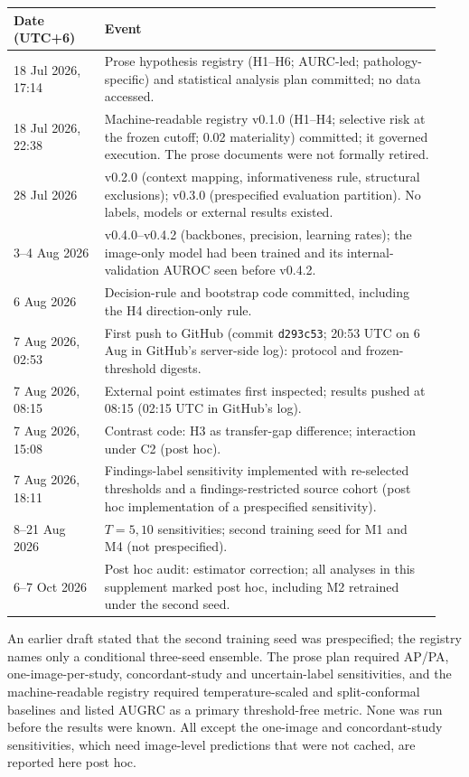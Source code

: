 \documentclass[10pt,a4paper]{article}
\begin{document}
\begin{center}\small
\begin{tabular}{p{0.2\linewidth}p{0.74\linewidth}}
\toprule
Date (UTC+6) & Event\\
\midrule
18 Jul 2026, 17:14 & Prose hypothesis registry (H1--H6; AURC-led; pathology-specific) and statistical analysis plan committed; no data accessed.\\
18 Jul 2026, 22:38 & Machine-readable registry v0.1.0 (H1--H4; selective risk at the frozen cutoff; 0.02 materiality) committed; it governed execution. The prose documents were not formally retired.\\
28 Jul 2026 & v0.2.0 (context mapping, informativeness rule, structural exclusions); v0.3.0 (prespecified evaluation partition). No labels, models or external results existed.\\
3--4 Aug 2026 & v0.4.0--v0.4.2 (backbones, precision, learning rates); the image-only model had been trained and its internal-validation AUROC seen before v0.4.2.\\
6 Aug 2026 & Decision-rule and bootstrap code committed, including the H4 direction-only rule.\\
7 Aug 2026, 02:53 & First push to GitHub (commit \texttt{d293c53}; 20:53 UTC on 6 Aug in GitHub's server-side log): protocol and frozen-threshold digests.\\
7 Aug 2026, 08:15 & External point estimates first inspected; results pushed at 08:15 (02:15 UTC in GitHub's log).\\
7 Aug 2026, 15:08 & Contrast code: H3 as transfer-gap difference; interaction under C2 (post hoc).\\
7 Aug 2026, 18:11 & Findings-label sensitivity implemented with re-selected thresholds and a findings-restricted source cohort (post hoc implementation of a prespecified sensitivity).\\
8--21 Aug 2026 & $T=5,10$ sensitivities; second training seed for M1 and M4 (not prespecified).\\
6--7 Oct 2026 & Post hoc audit: estimator correction; all analyses in this supplement marked post hoc, including M2 retrained under the second seed.\\
\bottomrule
\end{tabular}
\end{center}

An earlier draft stated that the second training seed was prespecified; the
registry names only a conditional three-seed ensemble. The prose plan required
AP/PA, one-image-per-study, concordant-study and uncertain-label sensitivities,
and the machine-readable registry required temperature-scaled and
split-conformal baselines and listed AUGRC as a primary threshold-free metric.
None was run before the results were known. All except the one-image and
concordant-study sensitivities, which need image-level predictions that were
not cached, are reported here post hoc.
\end{document}
